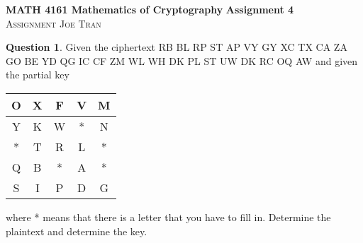 \documentclass[11pt]{article}
\date{January 9, 2024}
\theoremstyle{definition}\newtheorem{definition}{Definition}
\theoremstyle{definition}\newtheorem{question}{Question}
\theoremstyle{definition}\newtheorem*{solution}{Solution}
\begin{document}
\noindent \textbf{MATH 4161 Mathematics of Cryptography} \hfill \textbf{Assignment 4} \\
\noindent \textsc{Assignment} \hfill \textsc{Joe Tran}

\begin{question}
    Given the ciphertext \textsf{RB BL RP ST AP VY GY XC TX CA ZA GO BE YD QG IC CF ZM WL WH DK PL ST UW DK RC OQ AW} and given the partial key
    \begin{center}
        \begin{tabular}{|c|c|c|c|c|} \hline
            O & X & F & V & M \\ \hline
            Y & K & W & * & N \\ \hline
            * & T & R & L & * \\ \hline
            Q & B & * & A & * \\ \hline
            S & I & P & D & G \\ \hline
        \end{tabular}
    \end{center}
    where * means that there is a letter that you have to fill in. Determine the plaintext and determine the key.
\end{question}
\end{document}
